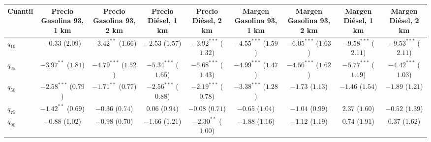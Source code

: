 \begin{tabular}{lcccccccc}
\toprule
Cuantil & Precio Gasolina 93, 1 km & Precio Gasolina 93, 2 km & Precio Diésel, 1 km & Precio Diésel, 2 km & Margen Gasolina 93, 1 km & Margen Gasolina 93, 2 km & Margen Diésel, 1 km & Margen Diésel, 2 km \\
\midrule
$q_{10}$ & $-0.33$ ($2.09$) & $-3.42^{**}$ ($1.66$) & $-2.53$ ($1.57$) & $-3.92^{***}$ ($1.32$) & $-4.55^{***}$ ($1.59$) & $-6.05^{***}$ ($1.63$) & $-9.58^{***}$ ($2.11$) & $-9.53^{***}$ ($2.11$) \\
$q_{25}$ & $-3.97^{**}$ ($1.81$) & $-4.79^{***}$ ($1.52$) & $-5.34^{***}$ ($1.65$) & $-5.68^{***}$ ($1.43$) & $-4.99^{***}$ ($1.47$) & $-4.56^{***}$ ($1.62$) & $-5.77^{***}$ ($1.19$) & $-4.42^{***}$ ($1.03$) \\
$q_{50}$ & $-2.58^{***}$ ($0.79$) & $-1.71^{**}$ ($0.77$) & $-2.56^{***}$ ($0.88$) & $-2.19^{***}$ ($0.78$) & $-3.38^{***}$ ($1.28$) & $-1.73$ ($1.13$) & $-1.46$ ($1.54$) & $-1.89$ ($1.21$) \\
$q_{75}$ & $-1.42^{**}$ ($0.69$) & $-0.36$ ($0.74$) & $0.06$ ($0.94$) & $-0.08$ ($0.71$) & $-0.65$ ($1.04$) & $-1.04$ ($0.99$) & $2.37$ ($1.60$) & $-0.52$ ($1.39$) \\
$q_{90}$ & $-0.88$ ($1.02$) & $-0.98$ ($0.70$) & $-1.66$ ($1.21$) & $-2.30^{**}$ ($1.00$) & $-1.88$ ($1.16$) & $-1.12$ ($1.19$) & $0.74$ ($1.91$) & $0.37$ ($1.62$) \\
\bottomrule
\end{tabular}
